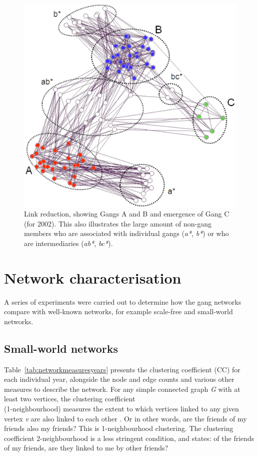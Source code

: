 \documentclass[twocolumn]{svjour3}          %
\theoremstyle{definition}
\begin{document}
\begin{figure}[htb]
\centering
\includegraphics[width=\columnwidth]{images/2002core_labelled}
\caption{Link reduction, showing Gangs A and B and emergence of
  Gang C (for 2002). This also illustrates the large amount of non-gang
  members who are associated with individual gangs (\emph{a*}, \emph{b*}) or who are intermediaries (\emph{ab*}, \emph{bc*}).}
\label{fig:2002core_labelled}
\end{figure}


\section{Network characterisation}\label{sec:networkcharacteristics}

A series of experiments were carried out to determine how the gang
networks compare with well-known networks, for example scale-free and
small-world networks.

\subsection{Small-world networks}\label{sec:smallworld}

Table~\ref{tab:networkmeasuresyears} presents the clustering
coefficient \citep{WattsStrogatz1998} (CC) for each individual year,
alongside the node and edge counts and various other measures to
describe the network. For any simple connected graph \emph{G} with at
least two vertices, the clustering coefficient\\
(1-neighbourhood) measures the extent to
which vertices linked to any given vertex \emph{v} are also linked to
each other \citep{WattsStrogatz1998}. Or in other words, are the friends of my friends also my
friends? This is 1-neighbourhood clustering. The clustering
coefficient 2-neighbourhood is a less stringent condition, and states:
of the friends of my friends, are they linked to me by other friends?
\end{document}
